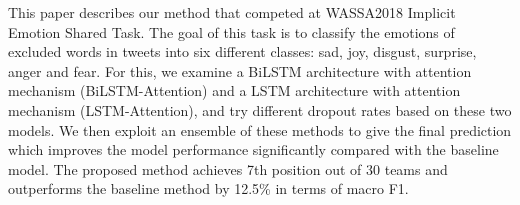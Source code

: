 This paper describes our method that competed at WASSA2018 Implicit Emotion Shared Task. The goal of this task is to classify the emotions of excluded words in tweets into six different classes: sad, joy, disgust, surprise, anger and fear. For this, we examine a BiLSTM architecture with attention mechanism (BiLSTM-Attention) and a LSTM architecture with attention mechanism (LSTM-Attention), and try different dropout rates based on these two models. We then exploit an ensemble of these methods to give the final prediction which improves the model performance significantly compared with the baseline model. The proposed method achieves 7th position out of 30 teams and outperforms the baseline method by 12.5\% in terms of macro F1.
